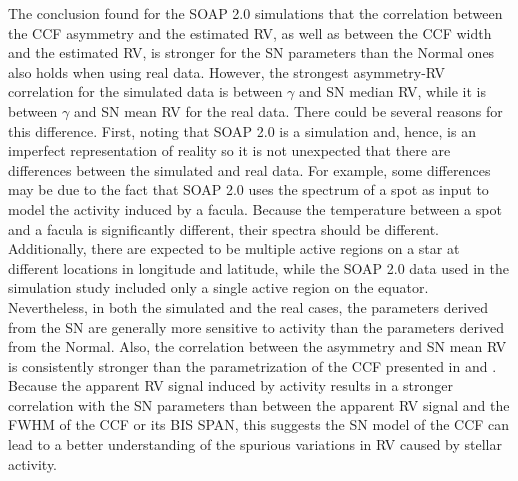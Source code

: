 \documentclass{aa}
\newcommand{\jessi}[1]{{\color{Purple}[[\textbf{Jessi: }#1]]}}
\newcommand{\xavier}[1]{{\color{blue}[[\textbf{Xavier: }#1]]}}
\newcommand{\umberto}[1]{{\color{green}[[\textbf{Umberto: }#1]]}}
\begin{document}
The conclusion found for the SOAP 2.0 simulations that the correlation between the CCF asymmetry and the estimated RV, as well as between the CCF width and the estimated RV, is stronger for the SN parameters than the Normal ones also holds when using real data.
%
However, the strongest asymmetry-RV correlation for the simulated data is between $\gamma$ and SN median RV, while it is between $\gamma$ and SN mean RV for the real data.
There could be several reasons for this difference. 
First, noting that SOAP 2.0 is a simulation and, hence, is an imperfect representation of reality so it is not unexpected that there are differences between the simulated and real data.
For example, some differences may be due to the fact that SOAP 2.0 uses the spectrum of a spot as input to model the activity induced by a facula.
Because the temperature between a spot and a facula is significantly different, their spectra should be different. 
Additionally, there are expected to be multiple active regions on a star at different locations in longitude and latitude, while the SOAP 2.0 data used in the simulation study included only a single active region on the equator. 
Nevertheless, in both the simulated and the real cases, the parameters derived from the SN are generally more sensitive to activity than the parameters derived from the Normal.  Also, the correlation between the asymmetry and SN mean RV is consistently stronger than the parametrization of the CCF presented in \citet{Boisse-2011} and \citet{Figueira-2013}. 
Because the apparent RV signal induced by activity  
results in a stronger correlation with the SN parameters
than between the apparent RV signal and the FWHM of the CCF or its BIS SPAN, this suggests the SN model of the CCF can lead to a better understanding of the spurious variations in RV caused by stellar activity.
\end{document}
